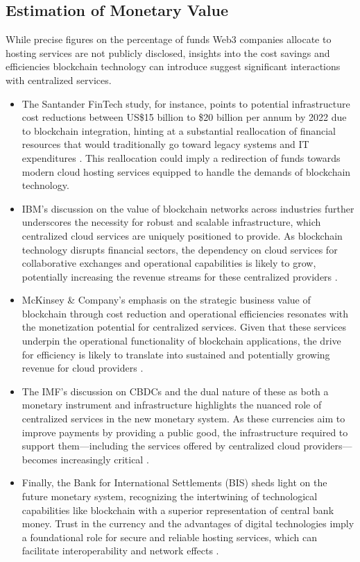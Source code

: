 \documentclass{article}
\begin{document}
\subsection{Estimation of Monetary Value}

While precise figures on the percentage of funds Web3 companies allocate to hosting services are not publicly disclosed, insights into the cost savings and efficiencies blockchain technology can introduce suggest significant interactions with centralized services. 

\begin{itemize}
    \item The Santander FinTech study, for instance, points to potential infrastructure cost reductions between US\$15 billion to \$20 billion per annum by 2022 due to blockchain integration, hinting at a substantial reallocation of financial resources that would traditionally go toward legacy systems and IT expenditures \cite{pwcblockchain}. This reallocation could imply a redirection of funds towards modern cloud hosting services equipped to handle the demands of blockchain technology.
    \item IBM's discussion on the value of blockchain networks across industries further underscores the necessity for robust and scalable infrastructure, which centralized cloud services are uniquely positioned to provide. As blockchain technology disrupts financial sectors, the dependency on cloud services for collaborative exchanges and operational capabilities is likely to grow, potentially increasing the revenue streams for these centralized providers \cite{ibmblockchain}.
    \item McKinsey \& Company's emphasis on the strategic business value of blockchain through cost reduction and operational efficiencies resonates with the monetization potential for centralized services. Given that these services underpin the operational functionality of blockchain applications, the drive for efficiency is likely to translate into sustained and potentially growing revenue for cloud providers \cite{mckinseyblockchain}.
    \item The IMF's discussion on CBDCs and the dual nature of these as both a monetary instrument and infrastructure highlights the nuanced role of centralized services in the new monetary system. As these currencies aim to improve payments by providing a public good, the infrastructure required to support them—including the services offered by centralized cloud providers—becomes increasingly critical \cite{imfcrypto}.
    \item Finally, the Bank for International Settlements (BIS) sheds light on the future monetary system, recognizing the intertwining of technological capabilities like blockchain with a superior representation of central bank money. Trust in the currency and the advantages of digital technologies imply a foundational role for secure and reliable hosting services, which can facilitate interoperability and network effects \cite{bismonetary}.
\end{itemize}
\end{document}
